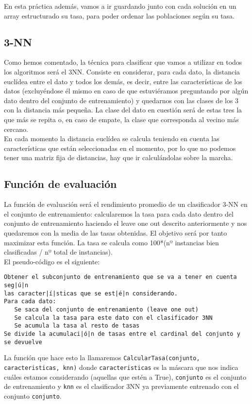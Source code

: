 \documentclass[12pt]{article}
\begin{document}
En esta práctica además, vamos a ir guardando junto con cada solución en un array estructurado su tasa, para poder ordenar las poblaciones según su tasa.

\subsection{3-NN}
Como hemos comentado, la técnica para clasificar que vamos a utilizar en todos los algoritmos será el 3NN. Consiste en considerar, para cada dato, la distancia euclídea entre el dato y todos los demás, es decir, entre las características de los datos (excluyéndose él mismo en caso de que estuviéramos preguntando por algún dato dentro del conjunto de entrenamiento) y quedarnos con las clases de los 3 con la distancia más pequeña. La clase del dato en cuestión será de estas tres la que más se repita o, en caso de empate, la clase que corresponda al vecino más cercano.\\
En cada momento la distancia euclídea se calcula teniendo en cuenta las características que están seleccionadas en el momento, por lo que no podemos tener una matriz fija de distancias, hay que ir calculándolas sobre la marcha.

\subsection{Función de evaluación}
La función de evaluación será el rendimiento promedio de un clasificador 3-NN en el conjunto de entrenamiento: calcularemos la tasa para cada dato dentro del conjunto de entrenamiento haciendo el leave one out descrito anteriormente y nos quedaremos con la media de las tasas obtenidas. El objetivo será por tanto maximizar esta función.
La tasa se calcula como 100*(nº instancias bien clasificadas / nº total de instancias).\\

El pseudo-código es el siguiente:\\
\begin{lstlisting}
Obtener el subconjunto de entrenamiento que se va a tener en cuenta seg|ú|n 
las caracter|í|sticas que se est|é|n considerando.
Para cada dato:
   Se saca del conjunto de entrenamiento (leave one out)
   Se calcula la tasa para este dato con el clasificador 3NN
   Se acumula la tasa al resto de tasas
Se divide la acumulaci|ó|n de tasas entre el cardinal del conjunto y se devuelve
\end{lstlisting}
La función que hace esto la llamaremos \texttt{CalcularTasa(conjunto, caracteristicas, knn)} donde \texttt{caracteristicas} es la máscara que nos indica cuáles estamos considerando (aquellas que estén a True), \texttt{conjunto} es el conjunto de entrenamiento y \texttt{knn} es el clasificador 3NN ya previamente entrenado con el conjunto \texttt{conjunto}.\\
\end{document}
